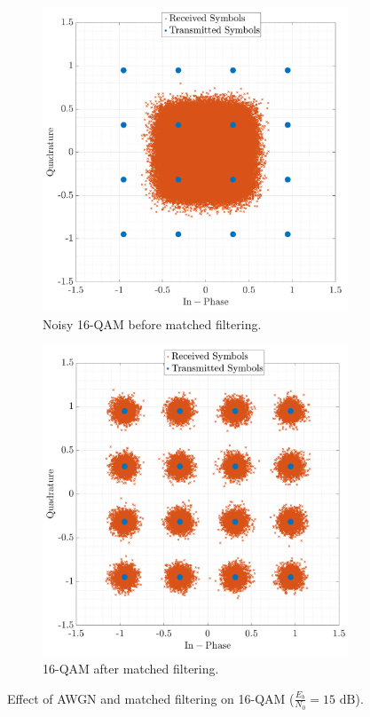 \documentclass[11pt]{article}
\begin{document}
	\begin{figure}[H]
		\centering
		\begin{subfigure}{0.4\textwidth}
			\includegraphics[width=\linewidth]{Images/const-noisy.png}
			\caption{Noisy 16-QAM before matched filtering.}
			\label{fig:const-noisy_cont_compact}
		\end{subfigure}\hfill
		\begin{subfigure}{0.4\textwidth}
			\includegraphics[width=\linewidth]{Images/const-filtered-down.png} 
			\caption{16-QAM after matched filtering.}
			\label{fig:const-filtered-down_cont_compact}
		\end{subfigure}
		\caption{Effect of AWGN and matched filtering on 16-QAM ($\frac{E_b}{N_0} = 15 \text{ dB}$).}
		\label{fig:constellations-noise_cont}
	\end{figure}
	
\end{document}
